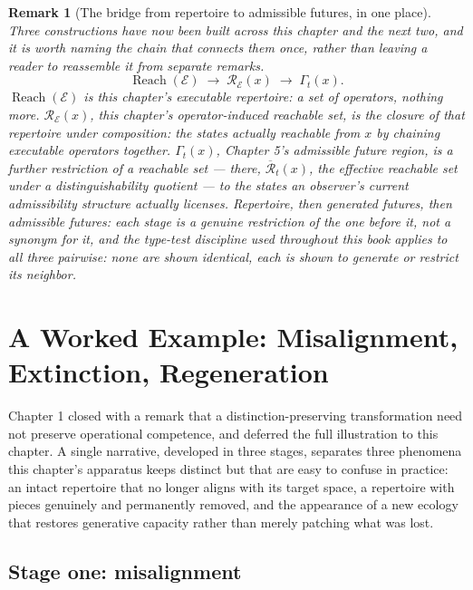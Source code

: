 \documentclass[12pt]{report}
\newtheorem{remark}[definition]{Remark}
\newcommand{\Reach}{\ensuremath{\operatorname{Reach}}}
\begin{document}
\begin{remark}[The bridge from repertoire to admissible futures, in one place]
\label{rem:bridge-diagram}
Three constructions have now been built across this chapter and the
next two, and it is worth naming the chain that connects them once,
rather than leaving a reader to reassemble it from separate remarks.
\[
\Reach(\mathcal{E}) \;\longrightarrow\; \mathcal{R}_\mathcal{E}(x) \;\longrightarrow\; \Gamma_t(x).
\]
$\Reach(\mathcal{E})$ is this chapter's executable repertoire: a set of
operators, nothing more. $\mathcal{R}_\mathcal{E}(x)$, this chapter's
operator-induced reachable set, is the closure of that repertoire under
composition: the states actually reachable from $x$ by chaining
executable operators together. $\Gamma_t(x)$, Chapter 5's admissible
future region, is a further restriction of a reachable set --- there,
$\overline{\mathcal{R}}_t(x)$, the effective reachable set under a
distinguishability quotient --- to the states an observer's current
admissibility structure actually licenses. Repertoire, then generated
futures, then admissible futures: each stage is a genuine restriction of
the one before it, not a synonym for it, and the type-test discipline
used throughout this book applies to all three pairwise: none are shown
identical, each is shown to generate or restrict its neighbor.
\end{remark}

\section{A Worked Example: Misalignment, Extinction, Regeneration}
\label{sec:wittgenstein}

Chapter 1 closed with a remark that a distinction-preserving
transformation need not preserve operational competence, and deferred
the full illustration to this chapter. A single narrative, developed in
three stages, separates three phenomena this chapter's apparatus keeps
distinct but that are easy to confuse in practice: an intact repertoire
that no longer aligns with its target space, a repertoire with pieces
genuinely and permanently removed, and the appearance of a new ecology
that restores generative capacity rather than merely patching what was
lost.

\subsection*{Stage one: misalignment}
\end{document}
